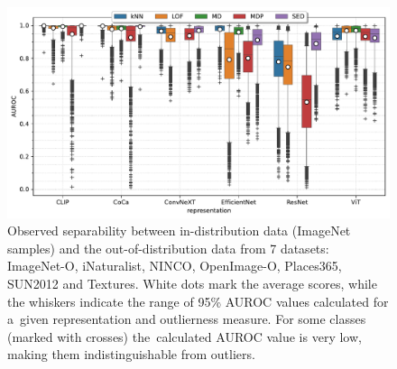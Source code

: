 \begin{figure}[t]
    \centering
    \vspace{-1.0em}  %
    \includegraphics[width=\textwidth]{images/real-separability/barplot-ImageNet-auroc(representation,model)-representation_CLIP,CoCa,ConvNeXT,EfficientNet,ResNet,ViT-class_0,999-data_ALL.pdf}
    \caption{Observed separability between in-distribution data (ImageNet samples) and the out-of-distribution data from 7 datasets: ImageNet-O, iNaturalist, NINCO, OpenImage-O, Places365, SUN2012 and Textures. White dots mark the average scores, while the whiskers indicate the range of 95\% AUROC values calculated for a~given representation and outlierness measure. For some classes (marked with crosses) the~calculated AUROC value is very low, making them indistinguishable from outliers.}
    \label{fig:image-auroc}
    \vspace{-1.0em}  %
\end{figure}

